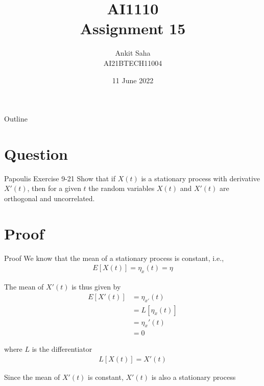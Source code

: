 \documentclass{beamer}
\title{AI1110 \\ Assignment 15}
\author{Ankit Saha \\ AI21BTECH11004}
\date{11 June 2022}
\providecommand{\mean}[1]{E\left[ #1 \right]}
\begin{document}
	\begin{frame}
		\titlepage
	\end{frame}
	
	\begin{frame}{Outline}
    		\tableofcontents
	\end{frame}
	
	\section{Question}
	\begin{frame}{Papoulis Exercise 9-21}
	Show that if $X(t)$ is a stationary process with derivative $X'(t)$, then for a given $t$ the random variables $X(t)$ and $X'(t)$ are orthogonal and uncorrelated.
	\end{frame}
	
	\section{Proof}
	\begin{frame}{Proof}
	We know that the mean of a stationary process is constant, i.e.,
	\begin{align}
		\mean{X(t)} = \eta_{x}(t) = \eta
	\end{align}
	
	The mean of $X'(t)$ is thus given by
	\begin{align}
		\mean{X'(t)} &= \eta_{x'}(t) \\
		&= L[\eta_{x}(t)] \\
		&= \eta_{x}'(t) \\
		&= 0
	\end{align}
	
	where $L$ is the differentiator
	\begin{align}
		L[X(t)] = X'(t)
	\end{align}
	
	Since the mean of $X'(t)$ is constant, $X'(t)$ is also a stationary process
	\end{frame}
	
\end{document}
